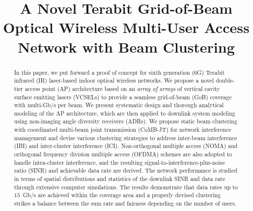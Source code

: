 \documentclass[lettersize,journal]{IEEEtran}
\begin{document}
\title{A Novel Terabit Grid-of-Beam Optical Wireless Multi-User Access Network with Beam Clustering}


\author{}

\maketitle

\begin{abstract}
In this paper, we put forward a proof of concept for sixth generation (6G) Terabit infrared (IR) laser-based indoor optical wireless networks. We propose a novel double-tier access point (AP) architecture based on an \textit{array of arrays} of vertical cavity surface emitting lasers (VCSELs) to provide a seamless grid-of-beam (GoB) coverage with multi-Gb/s per beam. We present systematic design and thorough analytical modeling of the AP architecture, which are then applied to downlink system modeling using non-imaging angle diversity receivers (ADRs). We propose static beam clustering with coordinated multi-beam joint transmission (CoMB-JT) for network interference management and devise various clustering strategies to address inter-beam interference (IBI) and inter-cluster interference (ICI). Non-orthogonal multiple access (NOMA) and orthogonal frequency division multiple access (OFDMA) schemes are also adopted to handle intra-cluster interference, and the resulting signal-to-interference-plus-noise ratio (SINR) and achievable data rate are derived. The network performance is studied in terms of spatial distributions and statistics of the downlink SINR and data rate through extensive computer simulations. The results demonstrate that data rates up to $15$~Gb/s are achieved within the coverage area and a properly devised clustering strikes a balance between the sum rate and fairness depending on the number of users.
\end{abstract}
\end{document}
